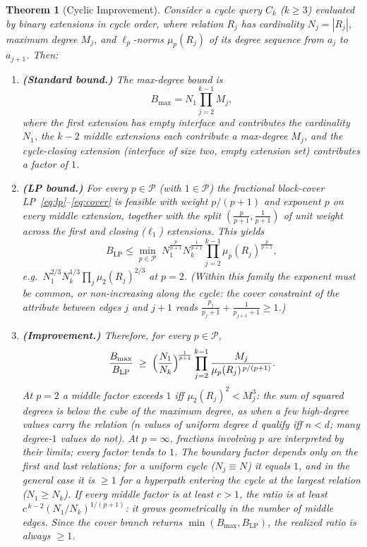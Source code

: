 \documentclass[sigconf, nonacm, acmthm=false]{acmart}
\newtheorem{theorem}{Theorem}
\begin{document}
\begin{theorem}[Cyclic Improvement]
\label{thm:cyclic}
Consider a cycle query $C_k$ ($k \ge 3$) evaluated by binary
extensions in cycle order, where relation $R_j$ has cardinality
$N_j = |R_j|$, maximum degree $M_j$, and $\ell_p$-norms $\mu_p(R_j)$ of
its degree sequence from $a_j$ to $a_{j+1}$.
Then:
\begin{enumerate}
\item \textbf{(Standard bound.)} The max-degree bound is
\[
B_{\max} = N_1 \prod_{j=2}^{k-1} M_j ,
\]
where the first extension has empty interface and contributes the
cardinality $N_1$, the $k-2$ \emph{middle} extensions each contribute
a max-degree $M_j$, and the cycle-closing extension (interface of size
two, empty extension set) contributes a factor of $1$.
\item \textbf{(LP bound.)} For every $p \in \mathcal{P}$ (with $1 \in \mathcal{P}$) the fractional
block-cover LP~\eqref{eq:lp}--\eqref{eq:cover} is feasible with weight
$p/(p{+}1)$ and exponent $p$ on every middle extension, together with
the split $(\frac{p}{p+1}, \frac{1}{p+1})$ of unit weight across the first
and closing ($\ell_1$) extensions. This yields
\[
B_{\mathrm{LP}} \le \min_{p \in \mathcal{P}}\; N_1^{\frac{p}{p+1}} N_k^{\frac{1}{p+1}}
\prod_{j=2}^{k-1} \mu_p(R_j)^{\frac{p}{p+1}} ,
\]
e.g.\ $N_1^{2/3} N_k^{1/3} \prod_j \mu_2(R_j)^{2/3}$ at $p{=}2$. (Within this family the exponent must be common, or non-increasing along the cycle: the cover
constraint of the attribute between edges $j$ and $j{+}1$ reads
$\frac{p_j}{p_j+1} + \frac{1}{p_{j+1}+1} \ge 1$.)
\item \textbf{(Improvement.)} Therefore, for every $p \in \mathcal{P}$,
\[
\frac{B_{\max}}{B_{\mathrm{LP}}} \;\ge\;
\Bigl(\frac{N_1}{N_k}\Bigr)^{\!\frac{1}{p+1}}
\prod_{j=2}^{k-1}
\frac{M_j}{\mu_p(R_j)^{\,p/(p+1)}} .
\]
At $p{=}2$ a middle factor exceeds $1$ iff $\mu_2(R_j)^2 < M_j^3$: the
sum of squared degrees is below the cube of the maximum degree, as when
a few high-degree values carry the relation ($n$ values of uniform degree
$d$ qualify iff $n<d$; many degree-$1$ values do not). At $p=\infty$, fractions involving $p$ are interpreted by their limits; every factor tends to $1$.
The boundary factor depends only on the first and last relations;
for a \emph{uniform} cycle ($N_j \equiv N$) it equals $1$, and in the
general case it is $\ge 1$ for a hyperpath entering the cycle at the
largest relation ($N_1 \ge N_k$). If every middle factor is at least
$c > 1$, the ratio is at least $c^{\,k-2}(N_1/N_k)^{1/(p+1)}$: it grows
geometrically in the number of middle edges. Since the cover branch returns
$\min(B_{\max}, B_{\mathrm{LP}})$, the realized ratio is always
$\ge 1$.
\end{enumerate}
\end{theorem}
\end{document}
